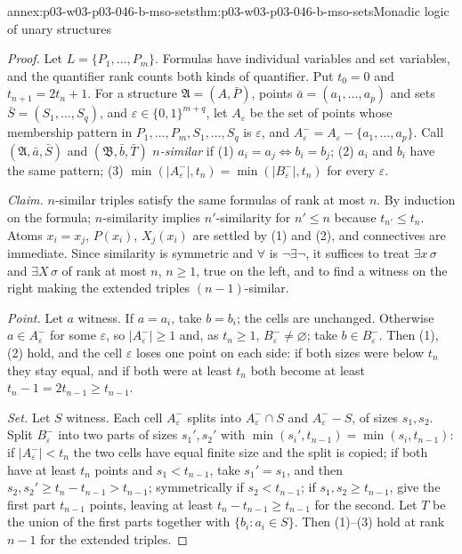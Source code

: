 \begin{annexitem}{annex:p03-w03-p03-046-b-mso-sets}{thm:p03-w03-p03-046-b-mso-sets}{Monadic logic of unary structures}
\begin{proof}
Let \(L=\{P_1,\dots,P_m\}\). Formulas have individual variables and set
variables, and the quantifier rank counts both kinds of quantifier. Put
\(t_0=0\) and \(t_{n+1}=2t_n+1\). For a structure \(\mathfrak A=(A,\bar
P)\), points \(\bar a=(a_1,\dots,a_p)\) and sets \(\bar
S=(S_1,\dots,S_q)\), and \(\varepsilon\in\{0,1\}^{m+q}\), let
\(A_\varepsilon\) be the set of points whose membership pattern in
\(P_1,\dots,P_m,S_1,\dots,S_q\) is \(\varepsilon\), and
\(A^-_\varepsilon=A_\varepsilon-\{a_1,\dots,a_p\}\). Call
\((\mathfrak A,\bar a,\bar S)\) and \((\mathfrak B,\bar b,\bar T)\)
\emph{\(n\)-similar} if (1) \(a_i=a_j\iff b_i=b_j\); (2) \(a_i\) and
\(b_i\) have the same pattern; (3)
\(\min(|A^-_\varepsilon|,t_n)=\min(|B^-_\varepsilon|,t_n)\) for every
\(\varepsilon\).

\emph{Claim.} \(n\)-similar triples satisfy the same formulas of rank at
most \(n\). By induction on the formula; \(n\)-similarity implies
\(n'\)-similarity for \(n'\le n\) because \(t_{n'}\le t_n\). Atoms
\(x_i=x_j\), \(P(x_i)\), \(X_j(x_i)\) are settled by (1) and (2), and
connectives are immediate. Since similarity is symmetric and \(\forall\)
is \(\neg\exists\neg\), it suffices to treat \(\exists x\,\sigma\) and
\(\exists X\,\sigma\) of rank at most \(n\), \(n\ge1\), true on the left,
and to find a witness on the right making the extended triples
\((n-1)\)-similar.

\emph{Point.} Let \(a\) witness. If \(a=a_i\), take \(b=b_i\); the cells are
unchanged. Otherwise \(a\in A^-_\varepsilon\) for some \(\varepsilon\), so
\(|A^-_\varepsilon|\ge1\) and, as \(t_n\ge1\),
\(B^-_\varepsilon\neq\varnothing\); take \(b\in B^-_\varepsilon\). Then
(1), (2) hold, and the cell \(\varepsilon\) loses one point on each side:
if both sizes were below \(t_n\) they stay equal, and if both were at
least \(t_n\) both become at least \(t_n-1=2t_{n-1}\ge t_{n-1}\).

\emph{Set.} Let \(S\) witness. Each cell \(A^-_\varepsilon\) splits into
\(A^-_\varepsilon\cap S\) and \(A^-_\varepsilon-S\), of sizes \(s_1,s_2\).
Split \(B^-_\varepsilon\) into two parts of sizes \(s_1',s_2'\) with
\(\min(s_i',t_{n-1})=\min(s_i,t_{n-1})\): if \(|A^-_\varepsilon|<t_n\) the two
cells have equal finite size and the split is copied; if both have at least
\(t_n\) points and \(s_1<t_{n-1}\), take \(s_1'=s_1\), and then
\(s_2,s_2'\ge t_n-t_{n-1}>t_{n-1}\); symmetrically if \(s_2<t_{n-1}\); if
\(s_1,s_2\ge t_{n-1}\), give the first part \(t_{n-1}\) points, leaving at
least \(t_n-t_{n-1}\ge t_{n-1}\) for the second. Let \(T\) be the union of
the first parts together with \(\{b_i:a_i\in S\}\). Then (1)--(3) hold at
rank \(n-1\) for the extended triples.


\end{proof}
\end{annexitem}
